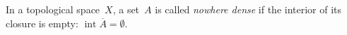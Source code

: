 \documentclass[12pt]{article}
\begin{document}
In a topological space~$X$, a set~$A$ is called \emph{nowhere dense} if the interior of its closure is empty: $\operatorname{int} \overline{A} = \emptyset$.
\end{document}
